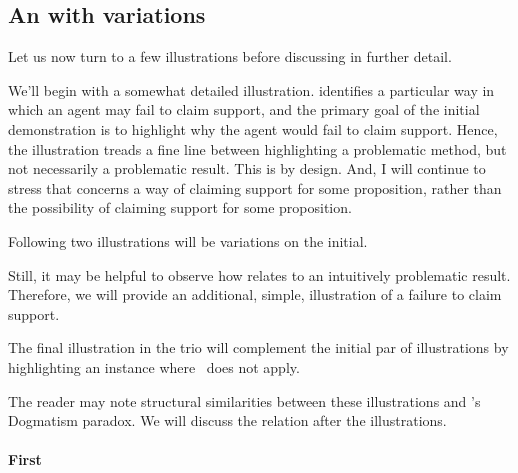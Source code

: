 \subsection{An  with variations}


\begin{note}
  Let us now turn to a few illustrations before discussing \nI{} in further detail.

  We'll begin with a somewhat detailed illustration.
  \nI{} identifies a particular way in which an agent may fail to claim support, and the primary goal of the initial demonstration is to highlight why the agent would fail to claim support.
  Hence, the illustration treads a fine line between highlighting a problematic method, but not necessarily a problematic result.
  This is by design.
  And, I will continue to stress that \nI{} concerns a way of claiming support for some proposition, rather than the possibility of claiming support for some proposition.

  Following two illustrations will be variations on the initial.

  Still, it may be helpful to observe how \nI{} relates to an intuitively problematic result.
  Therefore, we will provide an additional, simple, illustration of a failure to claim support.

  The final illustration in the trio will complement the initial par of illustrations by highlighting an instance where~\nI{} does not apply.

  The reader may note structural similarities between these illustrations and \citeauthor{Kripke:2011wv}'s Dogmatism paradox.
  We will discuss the relation after the illustrations.
\end{note}

\paragraph{First}


